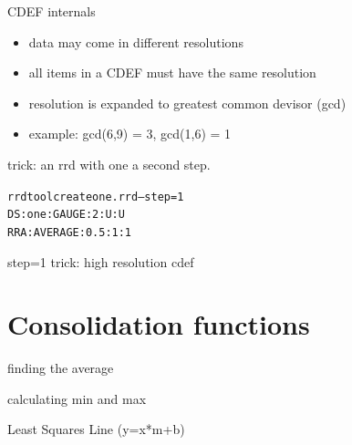 \begin{frame}[fragile]{CDEF internals}
\begin{itemize}
\item data may come in different resolutions
\item all items in a CDEF must have the same resolution
\item resolution is expanded to greatest common devisor (gcd)
\item example: gcd(6,9) = 3, gcd(1,6) = 1
\end{itemize}

trick: an rrd with one a second step.
\begin{alltt}
rrdtool create one.rrd --step=1
   DS:one:GAUGE:2:U:U
   RRA:AVERAGE:0.5:1:1
\end{alltt}
\end{frame}

\begin{frame}{step=1 trick: high resolution cdef}
\end{frame}


\section{Consolidation functions}

\begin{frame}{finding the average}
\end{frame}

\begin{frame}{calculating min and max}
\end{frame}




\begin{frame}{Least Squares Line (y=x*m+b)}
\end{frame}



